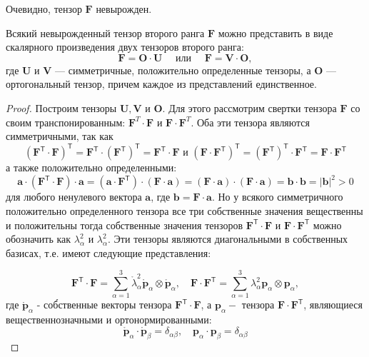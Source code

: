 Очевидно, тензор $ \mathbf{F} $ невырожден.

\begin{theorem*}
Всякий невырожденный тензор второго ранга
$\mathbf{F}$ можно представить в виде скалярного произведения двух тензоров
второго ранга: \[
\mathbf{F}=\mathbf{O} \cdot \mathbf{U} \quad \text { или } \quad
\mathbf{F}=\mathbf{V} \cdot \mathbf{O}, 
\]
где $ \mathbf{U} $ и $ \mathbf{V} $ --- симметричные, положительно определенные
тензоры, а $ \mathbf{O} $ --- ортогональный тензор, причем каждое из
представлений единственное.
\end{theorem*}
\begin{proof}
Построим тензоры $\mathbf{U}, \mathbf{V}$ и $ \mathbf{O} $. Для этого рассмотрим свертки
тензора $\mathbf{F}$ со своим транспонированным: $\mathbf{F}^{{T}} \cdot
\mathbf{F}$ и $\mathbf{F} \cdot \mathbf{F}^{{T}}$. Оба эти тензора
являются симметричными, так как
\[
\left(\mathbf{F}^{\mathsf{T}} \cdot
\mathbf{F}\right)^{\mathsf{T}}=\mathbf{F}^{\mathsf{T}}
\cdot\left(\mathbf{F}^{\mathsf{T}}\right)^{\mathsf{T}}=\mathbf{F}^{\mathsf{T}}
\cdot \mathbf{F} \text { и }\left(\mathbf{F} \cdot
\mathbf{F}^{\mathsf{T}}\right)^{\mathsf{T}}=\left(\mathbf{F}^{\mathsf{T}}\right)^{\mathsf{T}}
\cdot \mathbf{F}^{\mathsf{T}}=\mathbf{F} \cdot \mathbf{F}^{\mathsf{T}} \]
а также положительно определенными:
\[
\mathbf{a} \cdot\left(\mathbf{F}^{\mathsf{T}} \cdot \mathbf{F}\right) \cdot
\mathbf{a}=\left(\mathbf{a} \cdot \mathbf{F}^{\mathsf{T}}\right)
\cdot(\mathbf{F} \cdot \mathbf{a})=(\mathbf{F} \cdot \mathbf{a})
\cdot(\mathbf{F} \cdot \mathbf{a})=\mathbf{b} \cdot
\mathbf{b}=|\mathbf{b}|^{2}>0 \]
для любого ненулевого вектора $\mathbf{a}$, где $\mathbf{b}=\mathbf{F} \cdot
\mathbf{a}$. Но у всякого симметричного положительно определенного тензора все
три собственные значения вещественны и положительны тогда собственные значения
тензоров $\mathbf{F}^{\mathsf{T}} \cdot \mathbf{F}$ и $\mathbf{F} \cdot
\mathbf{F}^{\mathsf{T}}$ можно обозначить как $\lambda_{\alpha}^{2}$ и
$\lambda_{\alpha}^{2}$. Эти тензоры являются диагональными в собственных
базисах, т.е. имеют следующие представления:

\[
  \mathbf{F}^{\mathsf{T}} \cdot \mathbf{F}=\sum_{\alpha=1}^{3}
  \mathring{\lambda}_\alpha^2
\mathring{\mathbf{p}}_{\alpha} \otimes \mathring{\mathbf{p}}_{\alpha}, \quad
\mathbf{F} \cdot \mathbf{F}^{\mathsf{T}}=\sum_{\alpha=1}^{3}
\lambda_{\alpha}^{2} \mathbf{p}_{\alpha} \otimes \mathbf{p}_{\alpha},
\] 
где $\mathring{\mathbf{p}}_{\alpha}$ - соб́ственные векторы тензора
$\mathbf{F}^{\mathsf{T}} \cdot \mathbf{F}$, а $\mathbf{p}_{\alpha}-$ тензора
$\mathbf{F} \cdot \mathbf{F}^{\mathsf{T}}$, являющиеся вещественнозначными и
ортонормированными:
\[
\mathring{\mathbf{p}}_{\alpha} \cdot \mathring{\mathbf{p}}_{\beta}=\delta_{\alpha \beta}, \quad \mathbf{p}_{\alpha} \cdot \mathbf{p}_{\beta}=\delta_{\alpha \beta}
\]


\end{proof}
